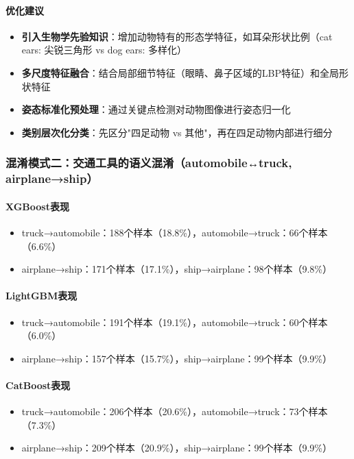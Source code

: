 \documentclass[UTF8]{report}
\theoremstyle{MyLineTheoremStyle} %
\theoremstyle{MyBlockTheoremStyle} %
\theoremstyle{MySubsubsectionStyle} %
\begin{document}
\paragraph{优化建议}
\begin{itemize}
    \item \textbf{引入生物学先验知识}：增加动物特有的形态学特征，如耳朵形状比例（cat ears: 尖锐三角形 vs dog ears: 多样化）
    \item \textbf{多尺度特征融合}：结合局部细节特征（眼睛、鼻子区域的LBP特征）和全局形状特征
    \item \textbf{姿态标准化预处理}：通过关键点检测对动物图像进行姿态归一化
    \item \textbf{类别层次化分类}：先区分"四足动物 vs 其他"，再在四足动物内部进行细分
\end{itemize}

\subsubsection{混淆模式二：交通工具的语义混淆（automobile↔truck, airplane→ship）}
\paragraph{XGBoost表现}
\begin{itemize}
    \item truck→automobile：188个样本（18.8\%），automobile→truck：66个样本（6.6\%）
    \item airplane→ship：171个样本（17.1\%），ship→airplane：98个样本（9.8\%）
\end{itemize}
\paragraph{LightGBM表现}
\begin{itemize}
    \item truck→automobile：191个样本（19.1\%），automobile→truck：60个样本（6.0\%）
    \item airplane→ship：157个样本（15.7\%），ship→airplane：99个样本（9.9\%）
\end{itemize}
\paragraph{CatBoost表现}
\begin{itemize}
    \item truck→automobile：206个样本（20.6\%），automobile→truck：73个样本（7.3\%）
    \item airplane→ship：209个样本（20.9\%），ship→airplane：99个样本（9.9\%）
\end{itemize}
\end{document}

